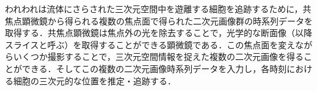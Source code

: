 
われわれは流体にさらされた三次元空間中を遊離する細胞を追跡するために，共焦点顕微鏡から得られる複数の焦点面で得られた二次元画像群の時系列データを取得する．共焦点顕微鏡は焦点外の光を除去することで，光学的な断面像（以降スライスと呼ぶ）を取得することができる顕微鏡である．この焦点面を変えながらいくつか撮影することで，三次元空間情報を捉えた複数の二次元画像を得ることができる．そしてこの複数の二次元画像時系列データを入力し，各時刻における細胞の三次元的な位置を推定・追跡する．